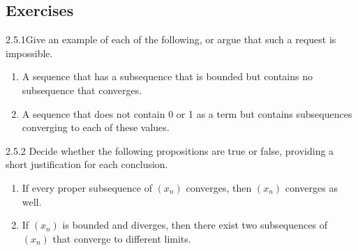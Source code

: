 \subsection{Exercises}

\begin{exercise}
    {2.5.1}Give an example of each of the following, or argue that such a request is impossible.
    \begin{enumerate}
        \item A sequence that has a subsequence that is bounded but contains no subsequence that converges.
        \item A sequence that does not contain 0 or 1 as a term but contains subsequences converging to each of these values.
    \end{enumerate}
\end{exercise}


\begin{exercise}
    {2.5.2} Decide whether the following propositions are true or false, providing a short justification for each conclusion.
    \begin{enumerate}
        \item If every proper subsequence of \((x_n)\) converges, then \((x_n)\) converges as well.
              \setcounter{enumi}{2}
        \item If \((x_n)\) is bounded and diverges, then there exist two subsequences of \((x_n)\) that converge to different limits.
    \end{enumerate}
\end{exercise}

